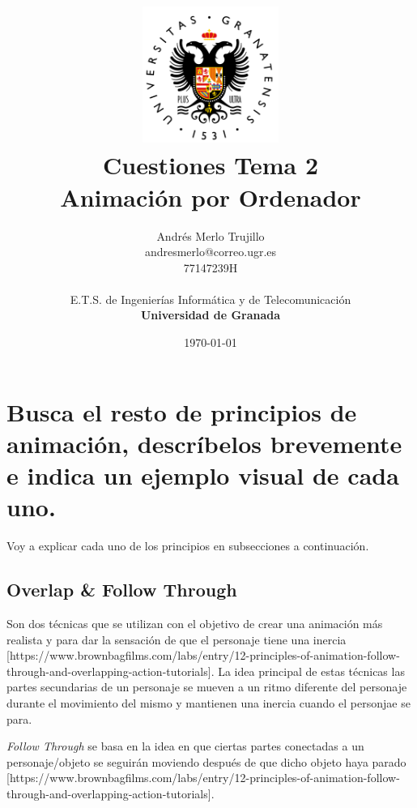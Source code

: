 \documentclass{article}
\title{
\includegraphics[width=1.75in]{imagenes/UGR-Logo.png} \\
\vspace*{1in}
\textbf{Cuestiones Tema 2} \\
Animación por Ordenador \\
\vspace*{0.5in}}
\author{Andrés Merlo Trujillo \\
andresmerlo@correo.ugr.es \\
77147239H \\ 
\vspace*{0.5in} \\
E.T.S. de Ingenierías Informática y de Telecomunicación \\
\textbf{Universidad de Granada}} \date{\today}
\begin{document}
\begin{titlingpage}
\maketitle
\end{titlingpage}

\tableofcontents

\newpage

\pagestyle{fancy}   %

\section{Busca el resto de principios de animación, descríbelos brevemente e indica un ejemplo visual de cada uno.}

Voy a explicar cada uno de los principios en subsecciones a continuación.


\subsection{Overlap \& Follow Through}

Son dos técnicas que se utilizan con el objetivo de crear una animación más realista y para dar la sensación de que el personaje tiene una inercia [https://www.brownbagfilms.com/labs/entry/12-principles-of-animation-follow-through-and-overlapping-action-tutorials]. La idea principal de estas técnicas las partes secundarias de un personaje se mueven a un ritmo diferente del personaje durante el movimiento del mismo y mantienen una inercia cuando el personjae se para.

\bigskip

\textit{Follow Through} se basa en la idea en que ciertas partes conectadas a un personaje/objeto se seguirán moviendo después de que dicho objeto haya parado [https://www.brownbagfilms.com/labs/entry/12-principles-of-animation-follow-through-and-overlapping-action-tutorials].
\end{document}
